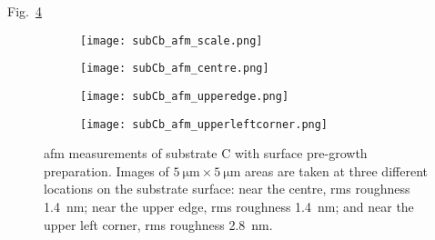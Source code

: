 Fig.~\ref{fig:subCb_afm}
\begin{figure}[htbp]
    \centering
    \begin{subfigure}[t]{0.032\linewidth}
    \centering
        \texttt{[image: subCb\_afm\_scale.png]}
        \captionsetup{list=no}
    \end{subfigure}
    \hfill
    \begin{subfigure}[t]{0.3\linewidth}
    \centering
        \texttt{[image: subCb\_afm\_centre.png]}
        \caption{}\label{fig:subCb_afm_centre}  %
    \end{subfigure}%
    \hfill
    \begin{subfigure}[t]{0.3\linewidth}
    \centering
        \texttt{[image: subCb\_afm\_upperedge.png]}
        \caption{}\label{fig:subCb_afm_edge}  %
    \end{subfigure}%
    \hfill
    \begin{subfigure}[t]{0.3\linewidth}
    \centering
        \texttt{[image: subCb\_afm\_upperleftcorner.png]}
        \caption{}\label{fig:subCb_afm_corner}  %
    \end{subfigure}%
    \caption[\Ac{afm} of substrate C with surface pre-growth preparation.]{\Acf{afm} measurements of substrate C with surface pre-growth preparation. Images of $\SI{5}{\micro\metre}\times\SI{5}{\micro\metre}$ areas are taken at three different locations on the substrate surface:  near the centre, \ac{rms} roughness \SI{1.4}{\nano\metre};  near the upper edge, \ac{rms} roughness \SI{1.4}{\nano\metre}; and  near the upper left corner, \ac{rms} roughness \SI{2.8}{\nano\metre}.}
    \label{fig:subCb_afm}
\end{figure} %

